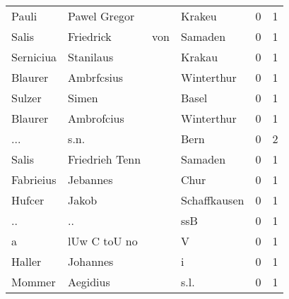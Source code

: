 \begin{tabular}{llllrr}
                    Pauli &                       Pawel Gregor &             &                                      Krakeu &          0 &         1 \\
                    Salis &                          Friedrick &         von &                                     Samaden &          0 &         1 \\
                Serniciua &                          Stanilaus &             &                                      Krakau &          0 &         1 \\
                  Blaurer &                         Ambrfcsius &             &                                  Winterthur &          0 &         1 \\
                   Sulzer &                              Simen &             &                                       Basel &          0 &         1 \\
                  Blaurer &                         Ambrofcius &             &                                  Winterthur &          0 &         1 \\
                      ... &                               s.n. &             &                                        Bern &          0 &         2 \\
                    Salis &                     Friedrieh Tenn &             &                                     Samaden &          0 &         1 \\
                Fabrieius &                           Jebannes &             &                                        Chur &          0 &         1 \\
                   Hufcer &                              Jakob &             &                                Schaffkausen &          0 &         1 \\
                       .. &                                 .. &             &                                         ssB &          0 &         1 \\
                        a &                       lUw C toU no &             &                                           V &          0 &         1 \\
                   Haller &                           Johannes &             &                                           i &          0 &         1 \\
                   Mommer &                           Aegidius &             &                                        s.l. &          0 &         1 \\

\end{tabular}
